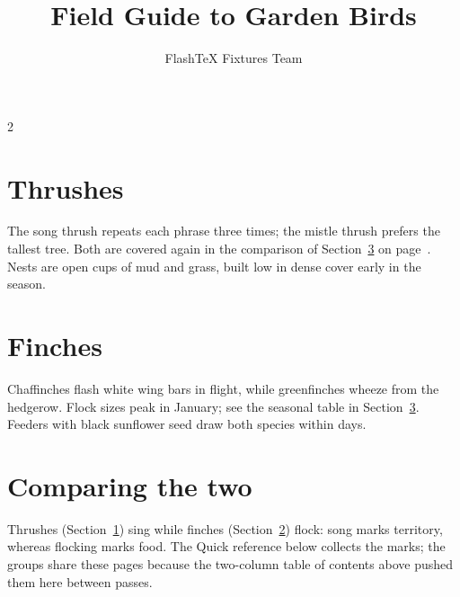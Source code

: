 \documentclass[11pt]{article}
\title{Field Guide to Garden Birds}
\author{FlashTeX Fixtures Team}
\date{}
\begin{document}
\maketitle
\begin{multicols}{2}
\tableofcontents
\section{Thrushes}
\label{sec:thrush}
The song thrush repeats each phrase three times; the mistle thrush prefers the tallest tree. Both are covered again in the comparison of Section~\ref{sec:compare} on page~\pageref{sec:compare}. Nests are open cups of mud and grass, built low in dense cover early in the season.
\section{Finches}
\label{sec:finch}
Chaffinches flash white wing bars in flight, while greenfinches wheeze from the hedgerow. Flock sizes peak in January; see the seasonal table in Section~\ref{sec:compare}. Feeders with black sunflower seed draw both species within days.
\section{Comparing the two}
\label{sec:compare}
Thrushes (Section~\ref{sec:thrush}) sing while finches (Section~\ref{sec:finch}) flock: song marks territory, whereas flocking marks food. The Quick reference below collects the marks; the groups share these pages because the two-column table of contents above pushed them here between passes.
\end{multicols}
\end{document}
